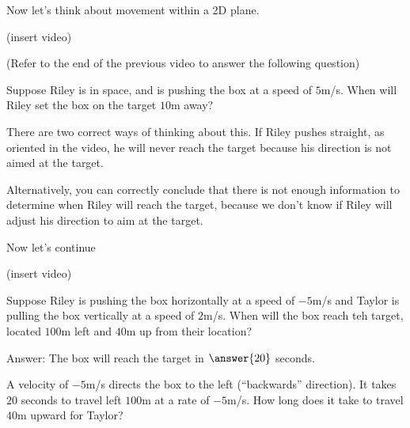 \documentclass{ximera}
\begin{document}
    Now let's think about movement within a 2D plane.

    (insert video)

\begin{problem}
    (Refer to the end of the previous video to answer the following question)
    
    Suppose Riley is in space, and is pushing the box at a speed of $5$m/s. When will Riley set the box on the target $10$m away?
        \begin{multipleChoice}
        \end{multipleChoice}
    \begin{feedback}
        There are two correct ways of thinking about this. If Riley pushes straight, as oriented in the video, he will never reach the target because his direction is not aimed at the target. 

        Alternatively, you can correctly conclude that there is not enough information to determine when Riley will reach the target, because we don't know if Riley will adjust his direction to aim at the target.
    \end{feedback}
\end{problem}

    Now let's continue

    (insert video)

\begin{problem}
    Suppose Riley is pushing the box horizontally at a speed of $-5$m/s and Taylor is pulling the box vertically at a speed of $2$m/s. When will the box reach teh target, located $100$m left and $40$m up from their location?

    Answer: The box will reach the target in $\answer{20}$ seconds.

    \begin{feedback}
    A velocity of $-5$m/s directs the box to the left (``backwards'' direction). It takes $20$ seconds to travel left $100$m at a rate of $-5$m/s. How long does it take to travel $40$m upward for Taylor?
    \end{feedback}

\end{problem}
\end{document}
